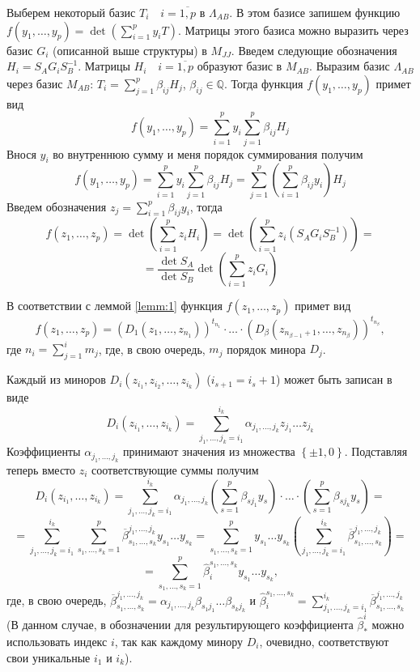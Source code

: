 \documentclass[11pt, a4paper]{article}
\begin{document}
Выберем некоторый базис $T_i\quad i=\overline{1,p}$ в $\Lambda_{AB}$. В этом базисе запишем функцию $f(y_1, \dots, y_p) = \det\left(\displaystyle\sum_{i=1}^{p}y_i T\right)$.
Матрицы этого базиса можно выразить через базис $G_{i}$ (описанной выше структуры) в $M_{JJ}$. Введем следующие обозначения $H_i = S_AG_iS_B^{-1}$.
Матрицы $H_i \quad i=\overline{1,p}$ образуют базис в $M_{AB}$.
Выразим базис $\Lambda_{AB}$ через базис $M_{AB}$: $T_i = \displaystyle\sum_{j = 1}^{p}\beta_{ij}H_j$, $\beta_{ij} \in \mathbb{Q}$. Тогда функция $f(y_1, \dots, y_p)$ примет вид 
\[
    f(y_1, \dots, y_p) = \sum_{i = 1}^{p}{y_i \sum_{j = 1}^{p}{\beta_{ij}H_j}}
\]
Внося $y_i$ во внутреннюю сумму и меня порядок суммирования получим
\[
    f(y_1, \dots, y_p) = \sum_{i = 1}^{p}{y_i \sum_{j = 1}^{p}{\beta_{ij}H_j}} = 
    \sum_{j = 1}^{p}{\left(\sum_{i = 1}^{p}{\beta_{ij}y_i}\right)H_j}
\]
Введем обозначения $z_j =\displaystyle\sum_{i = 1}^{p}{\beta_{ij}y_i}$, тогда
\[
    f(z_1, \dots, z_p) = \det\left(\displaystyle\sum_{i=1}^{p}{z_iH_i}\right) =
    \det\left(\displaystyle\sum_{i=1}^{p}{z_i\left(S_AG_iS_B^{-1}\right)}\right) =
\]
\[
        =\frac{\det S_A}{\det S_B}\det\left(\displaystyle\sum_{i=1}^{p}{z_iG_i}\right)
\]


В соответствии с леммой \ref{lemm:1} функция $f(z_1, \dots, z_p)$ примет вид
\[
    f(z_1, \dots, z_p) = (D_1(z_1, \dots, z_{n_1}))^{t_{n_1}}\cdot\ldots\cdot(D_{\beta}(z_{n_{\beta - 1} + 1}, \dots, z_{n_\beta}))^{t_{n_\beta}},
\]
где $n_i = \displaystyle\sum_{j = 1}^{i}m_j$, где, в свою очередь, $m_j$ порядок минора $D_j$.

Каждый из миноров $D_i(z_{i_1}, z_{i_2}, \dots, z_{i_k})$ ($i_{s+1} = i_s + 1$) может быть записан в виде 
\[
    D_i(z_{i_1}, \dots, z_{i_k}) = \sum_{j_1,\dots,j_k={i_1}}^{i_k}
    {\alpha_{j_1,\dots,j_k}}z_{j_1}\dots z_{j_k}
\]
Коэффициенты $\alpha_{j_1,\dots,j_k}$ принимают значения из множества $\left\{\pm1, 0\right\}$.
Подставляя теперь вместо $z_i$ соответствующие суммы получим
\[
    D_i(z_{i_1}, \dots, z_{i_k}) = \sum_{j_1,\dots,j_k={i_1}}^{i_k}
    {\alpha_{j_1,\dots,j_k}\left(\sum_{s = 1}^{p}{\beta_{s j_1}y_{s}}\right)\cdot\ldots\cdot\left(\sum_{s = 1}^{p}{\beta_{s j_k}y_{s}}\right)} =
\]
\[
    = \sum_{j_1,\dots,j_k={i_1}}^{i_k}
    {\sum_{s_1,\dots,s_k=1}^{p}{\overline{\beta}_{s_1,\dots,s_k}^{j_1,\dots,j_k} y_{s_1}\dots y_{s_k}}} =
    \sum_{s_1,\dots,s_k=1}^{p}{y_{s_1}\dots y_{s_k} \left(\sum_{j_1,\dots,j_k={i_1}}^{i_k}{\overline{\beta}_{s_1,\dots,s_k}^{j_1,\dots,j_k}}\right)} =
\]
\[
    =\sum_{s_1,\dots,s_k=1}^{p}{\hat{\beta}_{i}^{s_1,\dots,s_k} y_{s_1}\dots y_{s_k}},
\]
где, в свою очередь, $\overline{\beta}_{s_1,\dots,s_k}^{j_1,\dots,j_k} = \alpha_{j_1,\dots,j_k}\beta_{s_1 j_1}\dots\beta_{s_k j_k}$
и $\hat{\beta}_{i}^{s_1,\dots,s_k} = \displaystyle\sum_{j_1,\dots,j_k={i_1}}^{i_k}{\overline{\beta}_{s_1,\dots,s_k}^{j_1,\dots,j_k}}$ (В данном случае, в обозначении для результирующего коэффициента $\hat{\beta}_{\ast}^i$ можно 
использовать индекс $i$, так как каждому минору $D_i$, очевидно, соответствуют свои уникальные $i_1$ и $i_k$).
\end{document}

